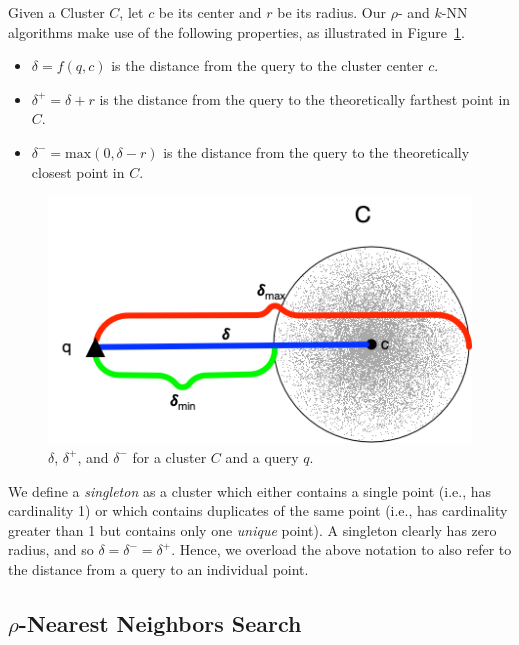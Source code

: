 Given a Cluster $C$, let $c$ be its center and $r$ be its radius. Our $\rho$- and $k$-NN algorithms make use of the following properties, as illustrated in Figure~\ref{fig:methods:deltas}.

\begin{itemize}
    \item $\delta = f(q, c)$ is the distance from the query to the cluster center $c$.
    \item $\delta^{+} = \delta + r$ is the distance from the query to the theoretically farthest point in $C$.
    \item $\delta^{-} = \text{max}(0, \delta - r)$ is the distance from the query to the theoretically closest point in $C$.
\end{itemize}

\begin{figure}[ht!]
    \centering
    \includegraphics[scale=0.5]{images/geometry/deltas.png}
    \caption{$\delta$, $\delta^{+}$, and $\delta^{-}$ for a cluster $C$ and a query $q$.}
    \label{fig:methods:deltas}
\end{figure}

We define a \emph{singleton} as a cluster which either contains a single point (i.e., has cardinality 1) or which contains duplicates of the same point (i.e., has cardinality greater than 1 but contains only one \emph{unique} point).
A singleton clearly has zero radius, and so $\delta = \delta^{-} = \delta^{+}$.
Hence, we overload the above notation to also refer to the distance from a query to an individual point.


\subsection{\texorpdfstring{$\rho$}{p}-Nearest Neighbors Search}
\label{subsec:methods:rnn-search}

